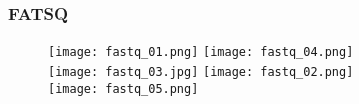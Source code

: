 \begin{frame}
  \frametitle{FATSQ}
  \begin{figure}
    \centering
    \texttt{[image: fastq\_01.png]}
    \texttt{[image: fastq\_04.png]}\\
    \vspace{1em}
    \texttt{[image: fastq\_03.jpg]}
    \texttt{[image: fastq\_02.png]}\\
    \vspace{1em}
    \texttt{[image: fastq\_05.png]}
  \end{figure}
\end{frame}


